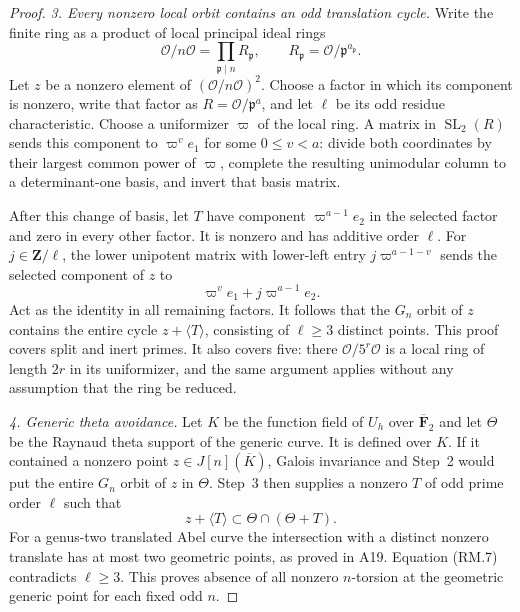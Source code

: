 \begin{proof}
\emph{3. Every nonzero local orbit contains an odd translation cycle.}
Write the finite ring as a product of local principal ideal rings
\[
 \mathcal O/n\mathcal O=\prod_{\mathfrak p\mid n}
                 R_{\mathfrak p},\qquad
 R_{\mathfrak p}=\mathcal O/\mathfrak p^{a_{\mathfrak p}}.
                                                               \tag{RM.5}
\]
Let $z$ be a nonzero element of $(\mathcal O/n\mathcal O)^2$.
Choose a factor in which its component is nonzero, write that
factor as $R=\mathcal O/\mathfrak p^a$, and let $\ell$ be its
odd residue characteristic.  Choose a uniformizer $\varpi$ of
the local ring.  A matrix in $\operatorname{SL}_2(R)$ sends
this component to $\varpi^v e_1$ for some $0\leq v<a$:
divide both coordinates by their largest common power of
$\varpi$, complete the resulting unimodular column to a
determinant-one basis, and invert that basis matrix.

After this change of basis, let $T$ have component
$\varpi^{a-1}e_2$ in the selected factor and zero in every
other factor.  It is nonzero and has additive order $\ell$.
For $j\in\mathbf Z/\ell$, the lower unipotent matrix with
lower-left entry $j\varpi^{a-1-v}$ sends the selected
component of $z$ to
\[
                    \varpi^v e_1+j\varpi^{a-1}e_2.             \tag{RM.6}
\]
Act as the identity in all remaining factors.  It follows that
the $G_n$ orbit of $z$ contains the entire cycle
$z+\langle T\rangle$, consisting of $\ell\geq3$ distinct points.
This proof covers split and inert primes.  It also covers five:
there $\mathcal O/5^r\mathcal O$ is a local ring of length
$2r$ in its uniformizer, and the same argument applies without
any assumption that the ring be reduced.

\emph{4. Generic theta avoidance.}
Let $K$ be the function field of $U_h$ over
$\overline{\mathbf F}_2$ and let $\Theta$ be the Raynaud theta
support of the generic curve.  It is defined over $K$.
If it contained a nonzero point $z\in J[n](\overline K)$,
Galois invariance and Step~2 would put the entire $G_n$ orbit
of $z$ in $\Theta$.  Step~3 then supplies a nonzero $T$ of
odd prime order $\ell$ such that
\[
                   z+\langle T\rangle
                         \subset\Theta\cap(\Theta+T).         \tag{RM.7}
\]
For a genus-two translated Abel curve the intersection with
a distinct nonzero translate has at most two geometric points,
as proved in A19.  Equation (RM.7) contradicts $\ell\geq3$.
This proves absence of all nonzero $n$-torsion at the geometric
generic point for each fixed odd $n$.


\end{proof}
